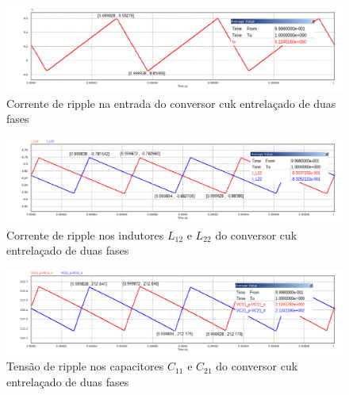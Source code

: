 \documentclass[
	12pt,				%
	openany,
	onseside,
	a4paper,			%
	english,			%
	french,				%
	spanish,			%
	brazil,				%
	]{abntex2}
\begin{document}
\begin{figure}[htb]%
	\captionsetup{justification=centering}
	\centering
		\includegraphics[width= \linewidth]{cuk_inter_ripp_I_S}
		\caption{Corrente de ripple na entrada do conversor cuk entrelaçado de duas fases}
		\label{fig:cuk_inter_ripp_I_S}
\end{figure}

\begin{figure}[htb]%
	\captionsetup{justification=centering}
	\centering
		\includegraphics[width= \linewidth]{cuk_inter_ripp_I_LX2}
		\caption{Corrente de ripple nos indutores $L_{12}$ e $L_{22}$ do conversor cuk entrelaçado de duas fases}
		\label{fig:cuk_inter_ripp_I_L2}
\end{figure}

\begin{figure}[H]%
	\captionsetup{justification=centering}
	\centering
		\includegraphics[width= \linewidth]{cuk_inter_ripp_V_CX1}
		\caption{Tensão de ripple nos capacitores $C_{11}$ e $C_{21}$ do conversor cuk entrelaçado de duas fases}
		\label{fig:cuk_inter_ripp_V_C1}
\end{figure}

\end{document}
